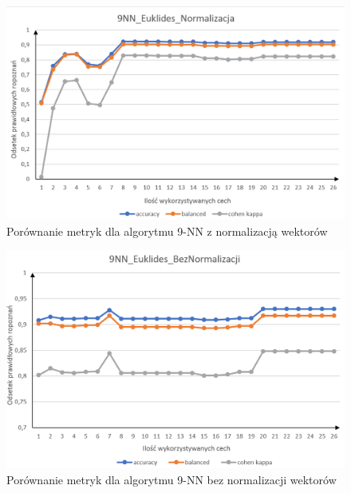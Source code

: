 \documentclass[12pt]{article}
\begin{document}
\begin{figure}[H]
	\centering
		\includegraphics[scale=0.66]{images/metrics/9nn_euklides_norm.png}
	\caption{Porównanie metryk dla algorytmu 9-NN z normalizacją wektorów}
	\label{metryki_euklides_norm_wyk}
\end{figure}
\begin{figure}[H]
	\centering
		\includegraphics[scale=0.66]{images/metrics/9nn_euklides_beznorm.png}
	\caption{Porównanie metryk dla algorytmu 9-NN bez normalizacji wektorów}
	\label{metryki_euklides_bnorm_wyk}
\end{figure}
\end{document}
